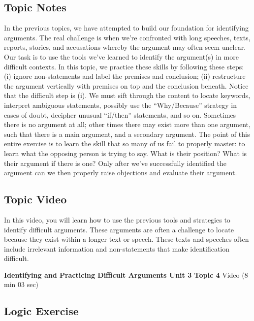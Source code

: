 \documentclass[
]{book}
\begin{document}
\hypertarget{topic-notes-11}{%
\subsection*{Topic Notes}\label{topic-notes-11}}

In the previous topics, we have attempted to build our foundation for identifying arguments. The real challenge is when we're confronted with long speeches, texts, reports, stories, and accusations whereby the argument may often seem unclear. Our task is to use the tools we've learned to identify the argument(s) in more difficult contexts. In this topic, we practice these skills by following these steps: (i) ignore non-statements and label the premises and conclusion; (ii) restructure the argument vertically with premises on top and the conclusion beneath. Notice that the difficult step is (i). We must sift through the content to locate keywords, interpret ambiguous statements, possibly use the ``Why/Because'' strategy in cases of doubt, decipher unusual ``if/then'' statements, and so on. Sometimes there is no argument at all; other times there may exist more than one argument, such that there is a main argument, and a secondary argument. The point of this entire exercise is to learn the skill that so many of us fail to properly master: to learn what the opposing person is trying to say. What is their position? What is their argument if there is one? Only after we've successfully identified the argument can we then properly raise objections and evaluate their argument.

\hypertarget{topic-video-11}{%
\subsection*{Topic Video}\label{topic-video-11}}

In this video, you will learn how to use the previous tools and strategies to identify difficult arguments. These arguments are often a challenge to locate because they exist within a longer text or speech. These texts and speeches often include irrelevant information and non-statements that make identification difficult.

\textbf{Identifying and Practicing Difficult Arguments Unit 3 Topic 4} Video (8 min 03 sec)

\hypertarget{logic-exercise}{%
\subsection*{Logic Exercise}\label{logic-exercise}}
\end{document}
